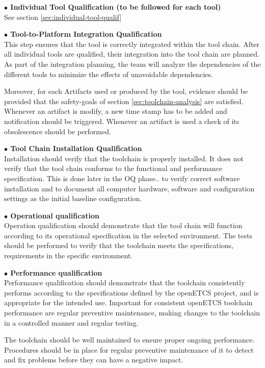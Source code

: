 {\bf $\bullet$ Individual Tool Qualification (to be followed for each
  tool)}\\
See section \ref{sec:individual-tool-qualif}

{\bf $\bullet$ Tool-to-Platform Integration Qualification}\\ This step
ensures that the tool is correctly integrated within the tool chain.
After all individual tools are qualified, their integration into the
tool chain are planned. As part of the integration planning, the team
will analyze the dependencies of the different tools to minimize the
effects of unavoidable dependencies.

Moreover, for each Artifacts used or produced by the tool, evidence
should be provided that the safety-goals of section
\ref{sec:toolchain-analysis} are satisfied. 
Whenever an artifact is modify, a new time stamp has to be added and
notification should be triggered. Whenever an artifact is used a check
of its obsolescence should be performed.

{\bf $\bullet$ Tool Chain Installation Qualification}\\
Installation should verify that the toolchain is properly
installed. It does not verify that the tool chain conforms to the functional and performance specification. This is done later in the OQ phase..  to verify correct software installation and to document all computer hardware, software and configuration settings as the initial baseline configuration.

{\bf $\bullet$ Operational qualification}\\
Operation qualification should demonstrate that the tool chain will function according to its operational specification in the selected environment. The tests should be performed to verify that the toolchain meets the specifications, requirements in the specific environment.

{\bf $\bullet$ Performance qualification}\\
Performance qualification should demonstrate that the toolchain consistently performs according to the specifications defined by the openETCS project, and is appropriate for the intended use. Important for consistent openETCS toolchain performance are regular preventive maintenance, making changes to the toolchain in a controlled manner and regular testing.

The toolchain should be well maintained to ensure proper ongoing performance. Procedures should be in place for regular preventive maintenance of it to detect and fix problems before they can have a negative impact.




